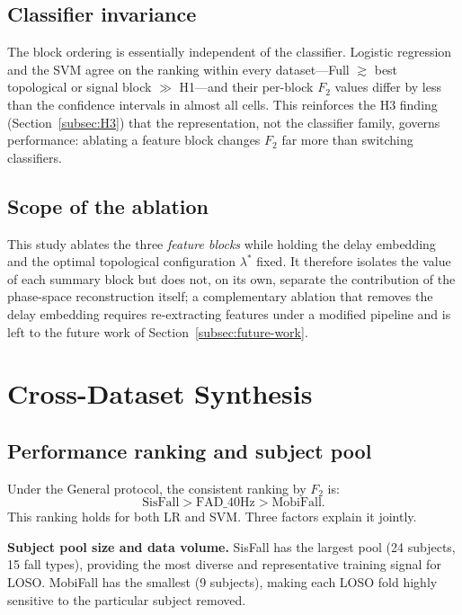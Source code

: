 \documentclass[onluarkali,ingilizce,yukseklisans,karton,LisansustuEgitim]{itutez}
\providecommand{\1}{\mathbf{1}}
\begin{document}
\subsection{Classifier invariance}

The block ordering is essentially independent of the classifier.  Logistic regression
and the SVM agree on the ranking within every dataset---Full $\gtrsim$ best topological
or signal block $\gg$ H1---and their per-block $F_2$ values differ by less than the
confidence intervals in almost all cells.  This reinforces the H3 finding
(Section~\ref{subsec:H3}) that the representation, not the classifier family, governs
performance: ablating a feature block changes $F_2$ far more than switching classifiers.

\subsection{Scope of the ablation}

This study ablates the three \emph{feature blocks} while holding the delay embedding
and the optimal topological configuration $\lambda^*$ fixed.  It therefore isolates the
value of each summary block but does not, on its own, separate the contribution of the
phase-space reconstruction itself; a complementary ablation that removes the delay
embedding requires re-extracting features under a modified pipeline and is left to the
future work of Section~\ref{subsec:future-work}.

\section{Cross-Dataset Synthesis}
\label{subsec:synthesis}

\subsection{Performance ranking and subject pool}

Under the General protocol, the consistent ranking by $F_2$ is:
\[
  \text{SisFall} > \text{FAD\_40Hz} > \text{MobiFall.}
\]
This ranking holds for both LR and SVM.  Three factors explain it jointly.

\textbf{Subject pool size and data volume.}  SisFall has the largest pool (24 subjects,
15 fall types), providing the most diverse and representative training signal for
LOSO.  MobiFall has the smallest (9 subjects), making each LOSO fold highly sensitive
to the particular subject removed.
\end{document}
